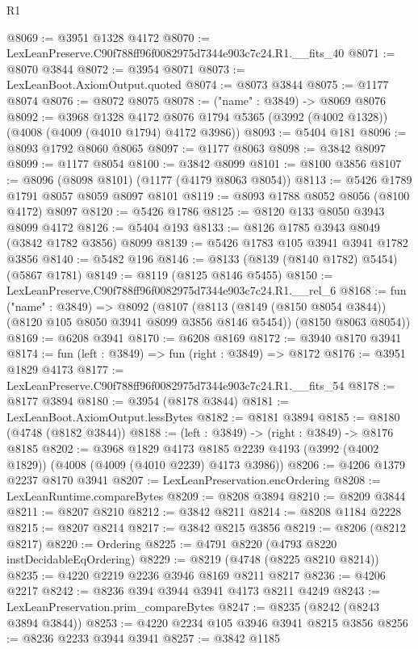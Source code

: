 \begin{lexlean}{R1}
\begin{coremodule}
@8069 := @3951 @1328 @4172
@8070 := LexLeanPreserve.C90f788ff96f0082975d7344e903c7c24.R1.__fits_40
@8071 := @8070 @3844
@8072 := @3954 @8071
@8073 := LexLeanBoot.AxiomOutput.quoted
@8074 := @8073 @3844
@8075 := @1177 @8074
@8076 := @8072 @8075
@8078 := ("name" : @3849) -> @8069 @8076
@8092 := @3968
    @1328
    @4172
    @8076
    @1794
    @5365
    (@3992 (@4002 @1328))
    (@4008 (@4009 (@4010 @1794) @4172 @3986))
@8093 := @5404 @181
@8096 := @8093 @1792 @8060 @8065
@8097 := @1177 @8063
@8098 := @3842 @8097
@8099 := @1177 @8054
@8100 := @3842 @8099
@8101 := @8100 @3856
@8107 := @8096 (@8098 @8101) (@1177 (@4179 @8063 @8054))
@8113 := @5426 @1789 @1791 @8057 @8059 @8097 @8101
@8119 := @8093 @1788 @8052 @8056 (@8100 @4172) @8097
@8120 := @5426 @1786
@8125 := @8120 @133 @8050 @3943 @8099 @4172
@8126 := @5404 @193
@8133 := @8126 @1785 @3943 @8049 (@3842 @1782 @3856) @8099
@8139 := @5426 @1783 @105 @3941 @3941 @1782 @3856
@8140 := @5482 @196
@8146 := @8133 (@8139 (@8140 @1782) @5454) (@5867 @1781)
@8149 := @8119 (@8125 @8146 @5455)
@8150 := LexLeanPreserve.C90f788ff96f0082975d7344e903c7c24.R1.__rel_6
@8168 := fun ("name" : @3849) =>
  @8092
    (@8107
      (@8113 (@8149 (@8150 @8054 @3844)) (@8120 @105 @8050 @3941 @8099 @3856 @8146 @5454))
      (@8150 @8063 @8054))
@8169 := @6208 @3941
@8170 := @6208 @8169
@8172 := @3940 @8170 @3941
@8174 := fun (left : @3849) => fun (right : @3849) => @8172
@8176 := @3951 @1829 @4173
@8177 := LexLeanPreserve.C90f788ff96f0082975d7344e903c7c24.R1.__fits_54
@8178 := @8177 @3894
@8180 := @3954 (@8178 @3844)
@8181 := LexLeanBoot.AxiomOutput.lessBytes
@8182 := @8181 @3894
@8185 := @8180 (@4748 (@8182 @3844))
@8188 := (left : @3849) -> (right : @3849) -> @8176 @8185
@8202 := @3968
    @1829
    @4173
    @8185
    @2239
    @4193
    (@3992 (@4002 @1829))
    (@4008 (@4009 (@4010 @2239) @4173 @3986))
@8206 := @4206 @1379 @2237 @8170 @3941
@8207 := LexLeanPreservation.encOrdering
@8208 := LexLeanRuntime.compareBytes
@8209 := @8208 @3894
@8210 := @8209 @3844
@8211 := @8207 @8210
@8212 := @3842 @8211
@8214 := @8208 @1184 @2228
@8215 := @8207 @8214
@8217 := @3842 @8215 @3856
@8219 := @8206 (@8212 @8217)
@8220 := Ordering
@8225 := @4791 @8220 (@4793 @8220 instDecidableEqOrdering)
@8229 := @8219 (@4748 (@8225 @8210 @8214))
@8235 := @4220 @2219 @2236 @3946 @8169 @8211 @8217
@8236 := @4206 @2217
@8242 := @8236 @394 @3944 @3941 @4173 @8211 @4249
@8243 := LexLeanPreservation.prim_compareBytes
@8247 := @8235 (@8242 (@8243 @3894 @3844))
@8253 := @4220 @2234 @105 @3946 @3941 @8215 @3856
@8256 := @8236 @2233 @3944 @3941
@8257 := @3842 @1185

\end{coremodule}
\end{lexlean}

